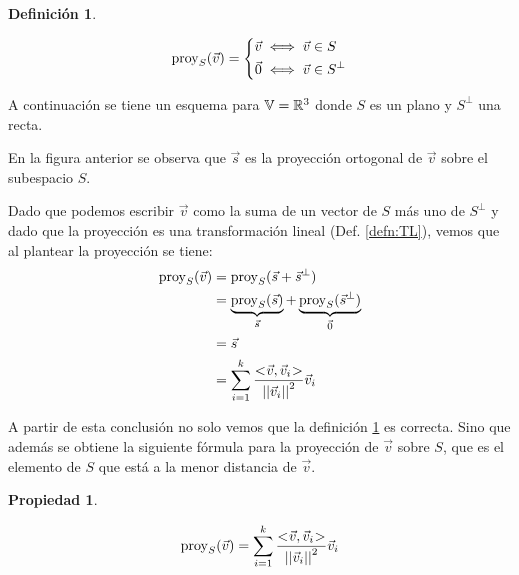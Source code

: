 \documentclass[a5paper,12pt,twoside]{book}
\newtheorem{defn}{{Definición}}[chapter]
\newtheorem{prop}{{Propiedad}}[chapter]
\begin{document}
\begin{mdframed}[style=MyFrame1]
    \begin{defn}
        \label{defn:proyOrto}
    \end{defn}
    \begin{equation*}
        \operatorname{proy}_S(\Vec{v}) =
        \left\{
        \begin{aligned}
            \Vec{v} & \iff \Vec{v} \in S
            \\
            \Vec{0} & \iff \Vec{v} \in S^\perp
        \end{aligned}
        \right.
    \end{equation*}
\end{mdframed}

A continuación se tiene un esquema para $\mathbb{V}=\mathbb{R}^3$ donde $S$ es un plano y $S^\perp$ una recta.

\begin{center}
\end{center}

En la figura anterior se observa que $\Vec{s}$ es la proyección ortogonal de $\Vec{v}$ sobre el subespacio $S$.

Dado que podemos escribir $\Vec{v}$ como la suma de un vector de $S$ más uno de $S^\perp$ y dado que la proyección es una transformación lineal (Def. \ref{defn:TL}), vemos que al plantear la proyección se tiene:
\begin{align*}
    \operatorname{proy}_S(\Vec{v}) &= \operatorname{proy}_S(\Vec{s}+\Vec{s}^\perp)
    \\
    &= \underbrace{\operatorname{proy}_S(\Vec{s})}_{\Vec{s}} + \underbrace{\operatorname{proy}_S(\Vec{s}^\perp)}_{\Vec{0}}
    \\
    &= \Vec{s}
    \\
    &= \sum_{i=1}^k \frac{<\hspace{-0.8mm}\Vec{v},\Vec{v}_i\hspace{-0.8mm}>}{{\left|\left| {\Vec{v}_i} \right|\right|}^2} \Vec{v}_i
\end{align*}

A partir de esta conclusión no solo vemos que la definición \ref{defn:proyOrto} es correcta. Sino que además se obtiene la siguiente fórmula para la proyección de $\Vec{v}$ sobre $S$, que es el elemento de $S$ que está a la menor distancia de $\Vec{v}$.

\begin{mdframed}[style=MyFrame1]
    \begin{prop}
        \label{prop:proyOrto2}
    \end{prop}
    \begin{equation*}
        \operatorname{proy}_S(\Vec{v}) = \sum_{i=1}^k \frac{<\hspace{-0.8mm}\Vec{v},\Vec{v}_i\hspace{-0.8mm}>}{{\left|\left| {\Vec{v}_i} \right|\right|}^2} \Vec{v}_i
    \end{equation*}
\end{mdframed}
\end{document}
